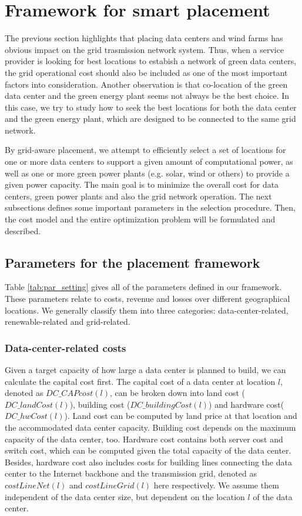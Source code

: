 \section{Framework for smart placement}
\label{sec:framework}

The previous section highlights that placing data centers and wind
farms has obvious impact on the grid trasmission network system. Thus,
when a service provider is looking for best locations to estabish a
network of green data centers, the grid operational cost should also
be included as one of the most important factors into
consideration. Another observation is that co-location of the green
data center and the green energy plant seems not always be the best
choice. In this case, we try to study how to seek the best locations
for both the data center and the green energy plant, which are
designed to be connected to the same grid network.

By grid-aware placement, we attempt to efficiently select a set of locations for one or more data centers to support a given amount of computational power, as well as one or more green power plants (e.g. solar, wind or others) to provide a given power capacity. The main goal is to minimize the overall cost for data centers, green power plants and also the grid network operation. The next subsections defines some important parameters in the selection procedure. Then, the cost model and the entire optimization problem will be formulated and described.

\subsection{Parameters for the placement framework}

Table \ref{tab:par_setting} gives all of the parameters defined in our framework.  These parameters relate to costs, revenue and losses over different geographical locations. We generally classify them into three categories: data-center-related, renewable-related and grid-related.

\subsubsection{Data-center-related costs} Given a target capacity of how large a data center is planned to build, we can calculate the capital cost first. The capital cost of a data center at location $l$, denoted as $DC\_CAPcost(l)$, can be broken down into land cost ($DC\_landCost(l)$), building cost ($DC\_buildingCost(l)$) and hardware cost($DC\_hwCost(l)$). Land cost can be computed by land price at that location and the accommodated data center capacity. Building cost depends on the maximum capacity of the data center, too. Hardware cost contains both server cost and switch cost, which can be computed given the total capacity of the data center. Besides, hardware cost also includes costs for building lines connecting the data center to the Internet backbone and the transmission grid, denoted as $costLineNet(l)$ and $costLineGrid(l)$ here respectively. We assume them independent of the data center size, but dependent on the location $l$ of the data center.

